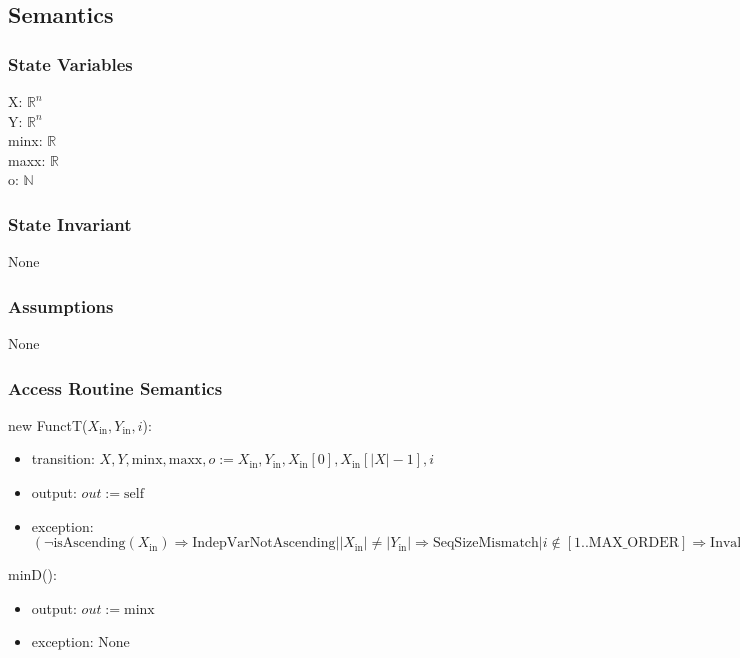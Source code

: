 \documentclass[12pt, titlepage]{article}
\begin{document}
\subsection {Semantics}

\subsubsection {State Variables}

X: $\mathbb{R}^n$\\
Y: $\mathbb{R}^n$\\
minx: $\mathbb{R}$\\
maxx: $\mathbb{R}$\\
o: $\mathbb{N}$

\subsubsection {State Invariant}

None

\subsubsection {Assumptions}

None

\subsubsection {Access Routine Semantics}

\noindent new FunctT($X_\text{in}, Y_\text{in}, i$):
\begin{itemize}
\item transition: $X, Y, \mbox{minx}, \mbox{maxx}, o := X_\text{in}, Y_\text{in}, X_\text{in}[0], X_\text{in}[|X|-1], i$

\item output: $out := \mbox{self}$
\item exception: $(\neg \mbox{isAscending}(X_\text{in}) \Rightarrow
  \mbox{IndepVarNotAscending} | |X_\text{in}| \neq |Y_\text{in}| \Rightarrow \mbox{SeqSizeMismatch}
  | i \notin [1..\mbox{MAX\_ORDER}] \Rightarrow \mbox{InvalidInterpOrder} |
  |X_\text{in}| < 3 \Rightarrow \mbox{TooFewDataPts})$
\end{itemize}

\noindent minD():
\begin{itemize}
\item output: $out := \mbox{minx}$
\item exception: None
\end{itemize}
\end{document}
